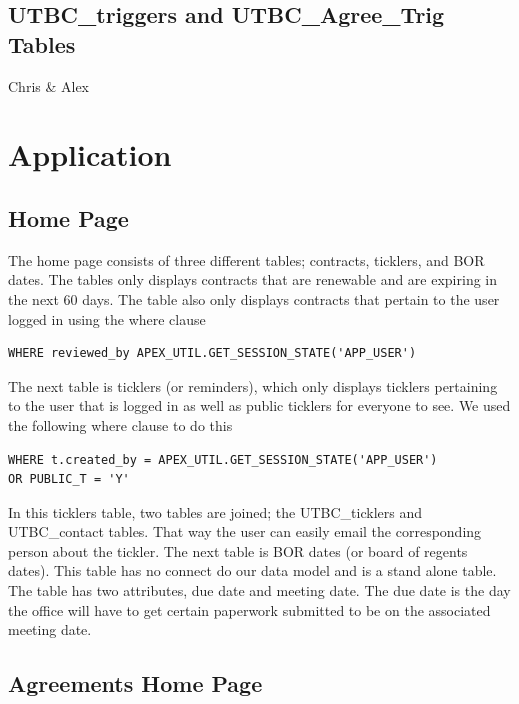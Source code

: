 \documentclass{report}
\begin{document}
\section{UTBC\_triggers and UTBC\_Agree\_Trig Tables}
Chris & Alex

\chapter{Application}

\section{Home Page}
The home page consists of three different tables; contracts, ticklers, and BOR dates. The tables only displays contracts that are renewable and are expiring in the next 60 days. The table also only displays contracts that pertain to the user logged in using the where clause

\begin{lstlisting}[caption=Contracts table where clause for user]
WHERE reviewed_by APEX_UTIL.GET_SESSION_STATE('APP_USER')
\end{lstlisting}

The next table is ticklers (or reminders), which only displays ticklers pertaining to the user that is logged in as well as public ticklers for everyone to see. We used the following where clause to do this

\begin{lstlisting}[caption=Tickler table where clause]
WHERE t.created_by = APEX_UTIL.GET_SESSION_STATE('APP_USER')
OR PUBLIC_T = 'Y'
\end{lstlisting}

In this ticklers table, two tables are joined; the UTBC\_ticklers and UTBC\_contact tables. That way the user can easily email the corresponding person about the tickler. 
The next table is BOR dates (or board of regents dates). This table has no connect do our data model and is a stand alone table. The table has two attributes, due date and meeting date. The due date is the day the office will have to get certain paperwork submitted to be on the associated meeting date.

\section{Agreements Home Page}
\end{document}

